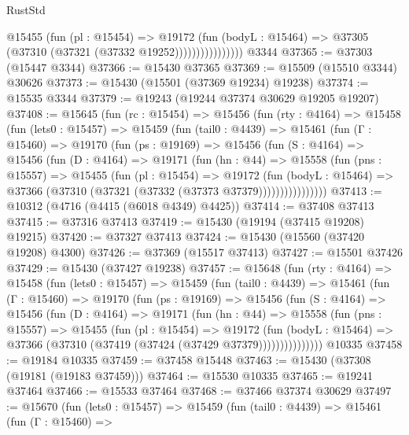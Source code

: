 \begin{lexlean}{RustStd}
\begin{coremodule}
                        @15455
                          (fun (pl : @15454) =>
                          @19172
                            (fun (bodyL : @15464) =>
                            @37305 (@37310 (@37321 (@37332 @19252))))))))))))))))
    @3344
@37365 := @37303 (@15447 @3344)
@37366 := @15430 @37365
@37369 := @15509 (@15510 @3344) @30626
@37373 := @15430 (@15501 (@37369 @19234) @19238)
@37374 := @15535 @3344
@37379 := @19243 (@19244 @37374 @30629 @19205 @19207)
@37408 := @15645
    (fun (rc : @15454) =>
    @15456
      (fun (rty : @4164) =>
      @15458
        (fun (lets0 : @15457) =>
        @15459
          (fun (tail0 : @4439) =>
          @15461
            (fun (Γ : @15460) =>
            @19170
              (fun (ps : @19169) =>
              @15456
                (fun (S : @4164) =>
                @15456
                  (fun (D : @4164) =>
                  @19171
                    (fun (hn : @44) =>
                    @15558
                      (fun (pns : @15557) =>
                      @15455
                        (fun (pl : @15454) =>
                        @19172
                          (fun (bodyL : @15464) =>
                          @37366 (@37310 (@37321 (@37332 (@37373 @37379))))))))))))))))
@37413 := @10312 (@4716 (@4415 (@6018 @4349) @4425))
@37414 := @37408 @37413
@37415 := @37316 @37413
@37419 := @15430 (@19194 (@37415 @19208) @19215)
@37420 := @37327 @37413
@37424 := @15430 (@15560 (@37420 @19208) @4300)
@37426 := @37369 (@15517 @37413)
@37427 := @15501 @37426
@37429 := @15430 (@37427 @19238)
@37457 := @15648
    (fun (rty : @4164) =>
    @15458
      (fun (lets0 : @15457) =>
      @15459
        (fun (tail0 : @4439) =>
        @15461
          (fun (Γ : @15460) =>
          @19170
            (fun (ps : @19169) =>
            @15456
              (fun (S : @4164) =>
              @15456
                (fun (D : @4164) =>
                @19171
                  (fun (hn : @44) =>
                  @15558
                    (fun (pns : @15557) =>
                    @15455
                      (fun (pl : @15454) =>
                      @19172
                        (fun (bodyL : @15464) =>
                        @37366 (@37310 (@37419 (@37424 (@37429 @37379)))))))))))))))
    @10335
@37458 := @19184 @10335
@37459 := @37458 @15448
@37463 := @15430 (@37308 (@19181 (@19183 @37459)))
@37464 := @15530 @10335
@37465 := @19241 @37464
@37466 := @15533 @37464
@37468 := @37466 @37374 @30629
@37497 := @15670
    (fun (lets0 : @15457) =>
    @15459
      (fun (tail0 : @4439) =>
      @15461
        (fun (Γ : @15460) =>

\end{coremodule}
\end{lexlean}
